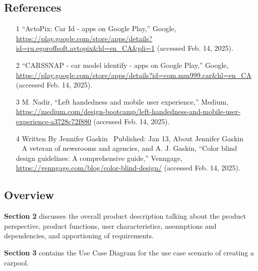 \documentclass[]{article}
\begin{document}
\subsection{References}
\label{sub:references}

\begin{itemize}
    \item[1] “AvtoPix: Car Id - apps on Google Play,” Google, \url{https://play.google.com/store/apps/details?id=ru.egoroffsoft.avtopix&hl=en_CA&pli=1} (accessed Feb. 14, 2025).
    \item[2] “CARSSNAP - car model identify - apps on Google Play,” Google, \url{https://play.google.com/store/apps/details?id=com.mm999.car&hl=en_CA} (accessed Feb. 14, 2025).
    \item[3] M. Nadir, “Left handedness and mobile user experience,” Medium, \url{https://medium.com/design-bootcamp/left-handedness-and-mobile-user-experience-a3728c72f880} (accessed Feb. 14, 2025).
    \item[4] Written By Jennifer Gaskin  Published: Jan 13, About Jennifer Gaskin      	A veteran of newsrooms and agencies, and A. J. Gaskin, “Color blind design guidelines: A comprehensive guide,” Venngage, \url{https://venngage.com/blog/color-blind-design/} (accessed Feb. 14, 2025).
\end{itemize}


\subsection{Overview}
\label{sub:overview}

\textbf{Section 2} discusses the overall product description talking about the product perspective, product functions, user characteristics, assumptions and dependencies, and apportioning of requirements. 

\textbf{Section 3} contains the Use Case Diagram for the use case scenario of creating a carpool. 
\end{document}
